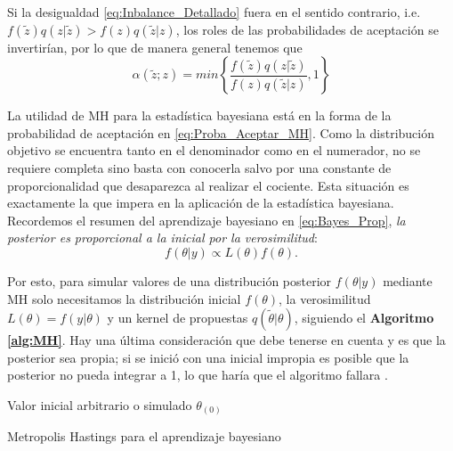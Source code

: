 Si la desigualdad \eqref{eq:Inbalance_Detallado} fuera en el sentido contrario, i.e. $f(\tilde{z})q(z|\tilde{z})>f(z)q(\tilde{z}|z)$, los roles de las probabilidades de aceptación se invertirían, por lo que de manera general tenemos que 
\begin{equation}
\label{eq:Proba_Aceptar_MH}
\alpha(\tilde{z};z)=min\left\lbrace\dfrac{f(\tilde{z})q(z|\tilde{z})}{f(z)q(\tilde{z}|z)},1\right\rbrace
\end{equation}

La utilidad de MH para la estadística bayesiana está en la forma de la probabilidad de aceptación en \eqref{eq:Proba_Aceptar_MH}. Como la distribución objetivo se encuentra tanto en el denominador como en el numerador, no se requiere completa sino basta con conocerla salvo por una constante de proporcionalidad que desaparezca al realizar el cociente. Esta situación es exactamente la que impera en la aplicación de la estadística bayesiana. Recordemos el resumen del aprendizaje bayesiano en \eqref{eq:Bayes_Prop}, \textit{la posterior es proporcional a la inicial por la verosimilitud}: 
\begin{equation*}
f(\theta|y) \propto L(\theta)f(\theta).
\end{equation*}

Por esto, para simular valores de una distribución posterior $f(\theta|y)$ mediante MH solo necesitamos la distribución inicial $f(\theta)$, la verosimilitud $L(\theta)=f(y|\theta)$ y un kernel de propuestas $q(\tilde{\theta}|\theta)$, siguiendo el \textbf{Algoritmo \ref{alg:MH}}. Hay una última consideración que debe tenerse en cuenta y es que la posterior sea propia; si se inició con una inicial impropia es posible que la posterior no pueda integrar a 1, lo que haría que el algoritmo fallara \parencite{RobertCasella10}.\\

\begin{algorithm}
\DontPrintSemicolon
Valor inicial arbitrario o simulado $\theta_{(0)}$\;

\caption{Metropolis Hastings para el aprendizaje bayesiano \label{alg:MH}}
\end{algorithm}

